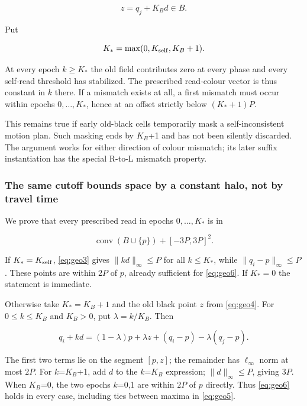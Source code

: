 \documentclass[
  11pt,
]{article}
\begin{document}
\begin{equation}\label{eq:geo4}
z=q_j+K_Bd\in B.
\end{equation}

Put

\begin{equation}\label{eq:geo5}
K_*=\max(0,K_{\rm self},K_B+1).
\end{equation}

At every epoch $k\ge K_*$ the old field contributes zero at every
phase and every self-read threshold has stabilized. The prescribed
read-colour vector is thus constant in \(k\) there. If a mismatch exists at
all, a first mismatch must occur within epochs \(0,\ldots,K_*\), hence at an
offset strictly below \((K_*+1)P\).

This remains true if early old-black cells temporarily mask a
self-inconsistent motion plan. Such masking ends by $K_B$+1 and has not
been silently discarded. The argument works for either direction of
colour mismatch; its later suffix instantiation has the special R-to-L
mismatch property.

\subsubsection{The same cutoff bounds space by a constant halo, not
by travel
time}\label{the-same-cutoff-bounds-space-by-a-constant-halo-not-by-travel-time}

We prove that every prescribed read in epochs \(0,\ldots,K_*\) is in

\begin{equation}\label{eq:geo6}
\operatorname{conv}(B\cup\{p\})+[-3P,3P]^2.
\end{equation}

If \(K_*=K_{\rm self}\), \eqref{eq:geo3} gives
$\|kd\|_\infty\le P$ for all $k\le K_*$,
while $\|q_i-p\|_\infty\le P$. These points
are within \(2P\) of \(p\), already sufficient for \eqref{eq:geo6}. If \(K_*=0\) the statement
is immediate.

Otherwise take \(K_*=K_B+1\) and the old black point \(z\) from \eqref{eq:geo4}. For
$0\le k\le K_B$ and $K_B>0$, put $\lambda=k/K_B$.
Then

\[
q_i+kd=(1-\lambda)p+\lambda z+(q_i-p)-\lambda(q_j-p).
\]

The first two terms lie on the segment \([p,z]\); the remainder has
$\ell_\infty$ norm at most \(2P\). For \(k\)=$K_B$+1, add \(d\) to the \(k\)=$K_B$
expression; $\|d\|_\infty\le P$, giving \(3P\).
When $K_B$=0, the two epochs \(k\)=0,1 are within \(2P\) of \(p\) directly. Thus
\eqref{eq:geo6} holds in every case, including ties between maxima in \eqref{eq:geo5}.
\end{document}
